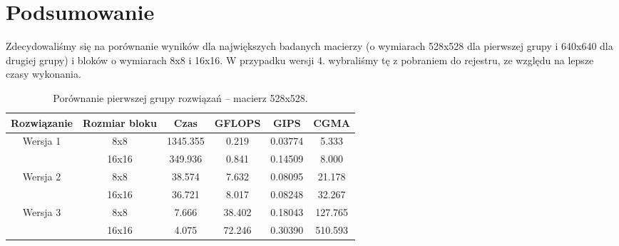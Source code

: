 \newpage
\section{Podsumowanie}
Zdecydowaliśmy się na porównanie wyników dla największych badanych macierzy (o wymiarach 528x528 dla pierwszej grupy i 640x640 dla drugiej grupy) i bloków o wymiarach 8x8 i 16x16. W przypadku wersji 4. wybraliśmy tę z pobraniem do rejestru, ze względu na lepsze czasy wykonania.

\begin{table}[H]
\centering
\begin{tabular}{|c|c|c|c|c|c|}
\hline
Rozwiązanie & Rozmiar bloku & Czas & GFLOPS & GIPS & CGMA \\ \hline
\multirow{2}{*}{Wersja 1} & 8x8 & 1345.355 & 0.219 & 0.03774 & 5.333 \\ \cline{2-6}
& 16x16 & 349.936 & 0.841 & 0.14509 & 8.000 \\ \hline
\multirow{2}{*}{Wersja 2} & 8x8 & 38.574 & 7.632 & 0.08095 & 21.178 \\ \cline{2-6}
& 16x16 & 36.721 & 8.017 & 0.08248 & 32.267 \\ \hline
\multirow{2}{*}{Wersja 3} & 8x8 & 7.666 & 38.402 & 0.18043 & 127.765 \\ \cline{2-6}
& 16x16 & 4.075 & 72.246 & 0.30390 & 510.593 \\ \hline
\end{tabular}
\caption{Porównanie pierwszej grupy rozwiązań -- macierz 528x528.}
\end{table}

